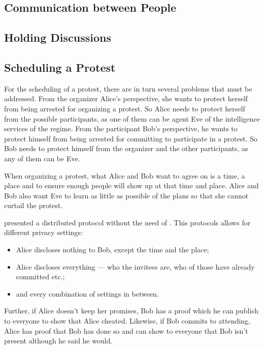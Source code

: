 

\subsection{Communication between People}
\label{Communicating}



\subsection{Holding Discussions}
\label{Discussions}



\subsection{Scheduling a Protest}
\label{Scheduling}

For the scheduling of a protest, there are in turn several problems that must 
be addressed.
From the organizer Alice's perspective, she wants to protect herself from being 
arrested for organizing a protest.
So Alice needs to protect herself from the possible participants, as one of 
them can be agent Eve of the intelligence services of the regime.
From the participant Bob's perspective, he wants to protect himself from being 
arrested for committing to participate in a protest.
So Bob needs to protect himself from the organizer and the other participants, 
as any of them can be Eve.

When organizing a protest, what Alice and Bob want to agree on is a time, 
a place and to ensure enough people will show up at that time and place.
Alice and Bob also want Eve to learn as little as possible of the plans so 
that she cannot curtail the protest.

\citet{EventsInvitations} presented a distributed protocol without the need of 
.
This protocols allows for different privacy settings:
\begin{itemize}
\item Alice discloses nothing to Bob, except the time and the place;
\item Alice discloses everything --- who the invitees are, who of those have 
  already committed etc.;
\item and every combination of settings in between.
\end{itemize}
Further, if Alice doesn't keep her promises, Bob has a proof which he can 
publish to everyone to show that Alice cheated.
Likewise, if Bob commits to attending, Alice has proof that Bob has done so and 
can show to everyone that Bob isn't present although he said he would.

